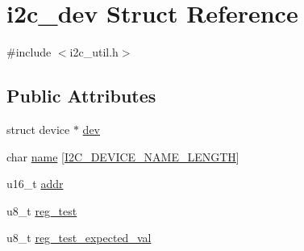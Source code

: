 \hypertarget{structi2c__dev}{\section{i2c\-\_\-dev Struct Reference}
\label{structi2c__dev}
}


{\ttfamily \#include $<$i2c\-\_\-util.\-h$>$}

\subsection*{Public Attributes}
\begin{DoxyCompactItemize}
\item 
struct device $\ast$ \hyperlink{structi2c__dev_ac4b6ba60143ff90df0ddc847deed7499}{dev}
\item 
char \hyperlink{structi2c__dev_aa3e3ecd39bec0681b174122b4a5e91e5}{name} \mbox{[}\hyperlink{i2c__util_8h_a48e1e64a2a8c3e1e1df44760d2a73eaa}{I2\-C\-\_\-\-D\-E\-V\-I\-C\-E\-\_\-\-N\-A\-M\-E\-\_\-\-L\-E\-N\-G\-T\-H}\mbox{]}
\item 
u16\-\_\-t \hyperlink{structi2c__dev_ae9308c72bfb06fea21da16f47b4e679b}{addr}
\item 
u8\-\_\-t \hyperlink{structi2c__dev_a20bd6a8e30216a5866cfc70fec9a3203}{reg\-\_\-test}
\item 
u8\-\_\-t \hyperlink{structi2c__dev_a46e0fffcf23e10012b1f5afc774088e7}{reg\-\_\-test\-\_\-expected\-\_\-val}
\end{DoxyCompactItemize}



